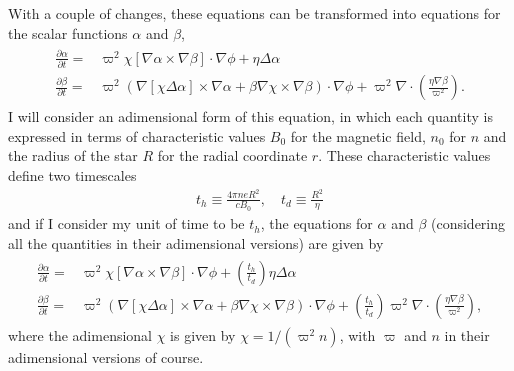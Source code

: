 \documentclass[letterpaper,10pt]{article}
\newcommand{\pp}{\partial}
\begin{document}
With a couple of changes, these equations can be transformed into equations for the scalar functions $\alpha$ and $\beta$,
\begin{eqnarray}
\begin{aligned}
\frac{\pp\alpha}{\pp t}=&\varpi^2\chi[\nabla\alpha\times\nabla\beta]\cdot\nabla\phi+\eta\Delta\alpha\\
\frac{\pp \beta}{\pp t}=&\varpi^2(\nabla[\chi\Delta\alpha]\times\nabla\alpha+\beta\nabla\chi\times\nabla\beta)\cdot\nabla\phi+\varpi^2\nabla\cdot\left(\frac{\eta\nabla\beta}{\varpi^2}\right).
\end{aligned}
\end{eqnarray}
I will consider an adimensional form of this equation, in which each quantity is expressed in terms of characteristic values $B_0$ for the magnetic field, $n_0$ for $n$ and the radius of the star $R$ for the radial coordinate $r$. These characteristic values define two timescales
\begin{eqnarray}
t_h\equiv\frac{4\pi ne R^2}{cB_0},\quad t_d\equiv\frac{R^2}{\eta}
\end{eqnarray}
and if I consider my unit of time to be $t_h$, the equations for $\alpha$ and $\beta$ (considering all the quantities in their adimensional versions) are given by
\begin{eqnarray}
\begin{aligned}
\frac{\pp\alpha}{\pp t}=&\varpi^2\chi[\nabla\alpha\times\nabla\beta]\cdot\nabla\phi+\left(\frac{t_h}{t_d}\right)\eta\Delta\alpha\\
\frac{\pp \beta}{\pp t}=&\varpi^2(\nabla[\chi\Delta\alpha]\times\nabla\alpha+\beta\nabla\chi\times\nabla\beta)\cdot\nabla\phi+\left(\frac{t_h}{t_d}\right)\varpi^2\nabla\cdot\left(\frac{\eta\nabla\beta}{\varpi^2}\right),
\end{aligned}\label{intro::eqs}
\end{eqnarray}
where the adimensional $\chi$ is given by $\chi=1/(\varpi^2 n)$, with $\varpi$ and $n$ in their adimensional versions of course.
\end{document}
